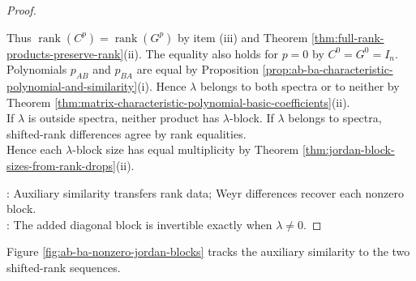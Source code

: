 \begin{theorem}
\begin{proof}
\begin{enumerate}[label=(\roman*)]
Thus $\operatorname{rank}(C^p)=\operatorname{rank}(G^p)$ by item (iii) and Theorem \ref{thm:full-rank-products-preserve-rank}(ii). The equality also holds for $p=0$ by $C^0=G^0=I_n$.\\
Polynomials $p_{AB}$ and $p_{BA}$ are equal by Proposition \ref{prop:ab-ba-characteristic-polynomial-and-similarity}(i). Hence $\lambda$ belongs to both spectra or to neither by Theorem \ref{thm:matrix-characteristic-polynomial-basic-coefficients}(ii).\\
If $\lambda$ is outside spectra, neither product has $\lambda$-block. If $\lambda$ belongs to spectra, shifted-rank differences agree by rank equalities.\\
Hence each $\lambda$-block size has equal multiplicity by Theorem \ref{thm:jordan-block-sizes-from-rank-drops}(ii).
\end{enumerate}
: Auxiliary similarity transfers rank data; Weyr differences recover each nonzero block.\\
: The added diagonal block is invertible exactly when $\lambda\neq0$.
\end{proof}
\end{theorem}

Figure \ref{fig:ab-ba-nonzero-jordan-blocks} tracks the auxiliary similarity to the two shifted-rank sequences.

\begin{illustrationfigure}[H]
  \centering
  
  \caption{For $\lambda\neq0$, the auxiliary similarity reduces the comparison to shifted ranks of $AB$ and $BA$.}
  \label{fig:ab-ba-nonzero-jordan-blocks}
\end{illustrationfigure}

